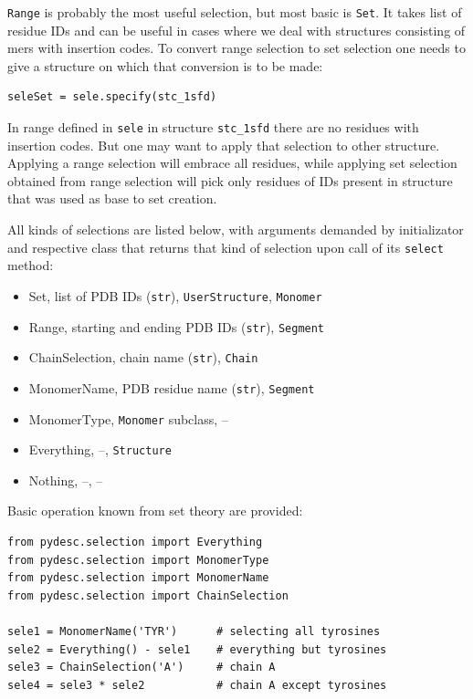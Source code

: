 \documentclass{article}
\begin{document}
\texttt{Range} is probably the most useful selection, but most basic is \texttt{Set}. It takes list of residue IDs and can be useful in cases where we deal with structures consisting of mers with insertion codes. To convert range selection to set selection one needs to give a structure on which that conversion is to be made:

\begin{lstlisting}
seleSet = sele.specify(stc_1sfd)
\end{lstlisting}

In range defined in \texttt{sele} in structure \texttt{stc\_{}1sfd} there are no residues with insertion codes. But one may want to apply that selection to other structure. Applying a range selection will embrace all residues, while applying set selection obtained from range selection will pick only residues of IDs present in structure that was used as base to set creation.

All kinds of selections are listed below, with arguments demanded by initializator and respective class that returns that kind of selection upon call of its \texttt{select} method:

\begin{itemize}
    \item Set, list of PDB IDs (\texttt{str}), \texttt{UserStructure}, \texttt{Monomer}
    \item Range, starting and ending PDB IDs (\texttt{str}), \texttt{Segment}
    \item ChainSelection, chain name (\texttt{str}), \texttt{Chain}
    \item MonomerName, PDB residue name (\texttt{str}), \texttt{Segment}
    \item MonomerType, \texttt{Monomer} subclass, --
    \item Everything, --, \texttt{Structure}
    \item Nothing, --, --
\end{itemize}

Basic operation known from set theory are provided:

\begin{lstlisting}
from pydesc.selection import Everything
from pydesc.selection import MonomerType
from pydesc.selection import MonomerName
from pydesc.selection import ChainSelection

sele1 = MonomerName('TYR')      # selecting all tyrosines
sele2 = Everything() - sele1    # everything but tyrosines
sele3 = ChainSelection('A')     # chain A
sele4 = sele3 * sele2           # chain A except tyrosines
\end{lstlisting}
\end{document}
